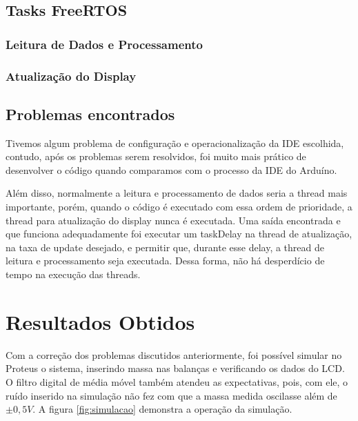 \documentclass[a4paper, 12pt]{article}
\begin{document}
	\subsection{Tasks FreeRTOS}
	
	\subsubsection{Leitura de Dados e Processamento}
	
	\subsubsection{Atualização do Display}
	
	\subsection{Problemas encontrados}
	\label{poblemas}
	Tivemos algum problema de configuração e operacionalização da IDE escolhida, contudo, após os problemas serem resolvidos, foi muito mais prático de desenvolver o código quando comparamos com o processo da IDE do Arduíno. 

	Além disso, normalmente a leitura e processamento de dados seria a thread mais importante, porém, quando o código é executado com essa ordem de prioridade, a thread para atualização do display nunca é executada. Uma saída encontrada e que funciona adequadamente foi executar um taskDelay na thread de atualização, na taxa de update desejado, e permitir que, durante esse delay, a thread de leitura e processamento seja executada. Dessa forma, não há desperdício de tempo na execução das threads.  
	
	
	\section{Resultados Obtidos}
	Com a correção dos problemas discutidos anteriormente, foi possível simular no Proteus o sistema, inserindo massa nas balanças e verificando os dados do LCD. O filtro digital de média móvel também atendeu as expectativas, pois, com ele, o ruído inserido na simulação não fez com que a massa medida oscilasse além de $ \pm 0,5V $. A figura \ref{fig:simulacao} demonstra a operação da simulação.
	
\end{document}
